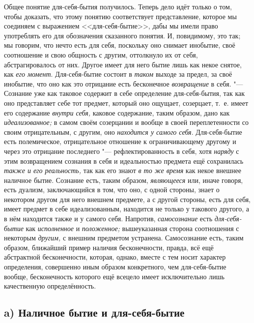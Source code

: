 Общее понятие для-себя-бытия получилось. Теперь дело идёт только о том,
чтобы доказать, что этому понятию соответствует представление, которое мы
соединяем с выражением <<для-себя-бытие>>, дабы мы имели право употреблять
его для обозначения сказанного понятия. И, повидимому, это так; мы говорим,
что нечто есть для себя, поскольку оно снимает инобытие, своё соотношение и
свою общность с другим, оттолкнуло их от себя, абстрагировалось от них.
Другое имеет для него бытие лишь как некое снятое, как
{\em его момент}. Для-себя-бытие состоит в
{\em таком} выходе за предел, за своё инобытие, что оно
как это отрицание есть бесконечное {\em возвращение} в
себя. "--- Сознание уже как таковое содержит в себе определение
для-себя-бытия, так как оно представляет себе тот предмет, который оно
ощущает, созерцает, т.~е. имеет его содержание
{\em внутри себя,} каковое содержание, таким образом,
дано как {\em идеализованное;} в самом своём созерцании
и вообще в своей переплетенности со своим отрицательным, с другим, оно
{\em находится у самого себя}. Для-себя-бытие есть
полемическое, отрицательное отношение к ограничивающему другому и через это
отрицание последнего "--- рефлектированность в себя, хотя
{\em наряду} с этим возвращением сознания в себя и
идеальностью предмета ещё сохранилась {\em также и его
реальность,} так как его знают {\em в то же время} как
некое внешнее наличное бытие. Сознание есть, таким образом,
{\em являющееся} или, иначе говоря, есть дуализм,
заключающийся в том, что оно, с одной стороны, знает о некотором другом для
него внешнем предмете, а с другой стороны, есть для себя, имеет предмет в
себе идеализованным, находится не только у такового другого, а в нём
находится также и у самого себя. Напротив, {\em самосознание} есть
{\em для-себя-бытие} как {\em исполненное} и
{\em положенное;} вышеуказанная сторона соотношения с
некоторым {\em другим,} с внешним предметом устранена.
Самосознание есть, таким образом, ближайший пример наличия бесконечности,
правда, всё ещё абстрактной бесконечности, которая, однако, вместе с тем
носит характер определения, совершенно иным образом конкретного, чем
для-себя-бытие вообще, бесконечность которого ещё всецело имеет
исключительно лишь качественную определённость.

\subsection[a) Наличное бытие и для-себя-бытие]{a) Наличное бытие и для-себя-бытие}

